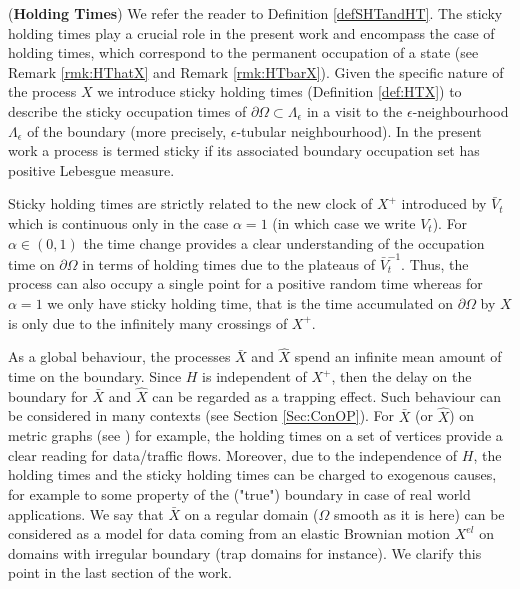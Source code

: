 \documentclass[11pt,a4paper]{article}
\newcommand{\magenta}{black}
\begin{document}
({\bf Holding Times}) {\color{\magenta} We refer the reader to Definition \ref{defSHTandHT}. The sticky holding times play a crucial role in the present work and encompass the case of holding times, which correspond to the permanent occupation of a state (see Remark \ref{rmk:HThatX} and Remark \ref{rmk:HTbarX}). Given the specific nature of the process $X$ we introduce sticky holding times (Definition \ref{def:HTX}) to describe the sticky occupation times of $\partial \Omega \subset \Lambda_\epsilon$ in a visit to the $\epsilon$-neighbourhood $\Lambda_\epsilon$ of the boundary (more precisely, $\epsilon$-tubular neighbourhood).} In the present work a process is termed sticky if its associated boundary occupation set has positive Lebesgue measure. 

Sticky holding times are strictly related to the new clock of $X^+$ introduced by $\bar{V}_t$ which is continuous only in the case $\alpha=1$ (in which case we write $V_t$). For $\alpha \in (0,1)$ the time change provides a clear understanding of the occupation time on $\partial \Omega$ in terms of holding times due to the plateaus of $\bar{V}_t^{-1}$. Thus, the process can also occupy a single point for a positive random time whereas for $\alpha=1$ we only have sticky holding time, that is the time accumulated on $\partial \Omega$ by $X$ is only due to the infinitely many crossings of $X^+$. 

As a global behaviour, the processes $\bar{X}$ and $\hat{X}$ spend an infinite mean amount of time on the boundary. Since $H$ is independent of $X^+$, then the delay on the boundary for $\bar{X}$ and $\hat{X}$ can be regarded as a trapping effect. Such behaviour can be considered in many contexts (see Section \ref{Sec:ConOP}). For $\bar{X}$ (or $\hat{X}$) on metric graphs (see \cite{BonDov}) for example, the holding times on a set of vertices provide a clear reading for data/traffic flows. Moreover, due to the independence of $H$, the holding times and the sticky holding times can be charged to exogenous causes, for example to some property of the ("true") boundary in case of real world applications. We say that $\bar{X}$ on a regular domain ($\Omega$ smooth as it is here) can be considered as a model for data coming from an elastic Brownian motion $X^{el}$ on domains with irregular boundary (trap domains for instance). We clarify this point in the last section of the work. 
\end{document}
